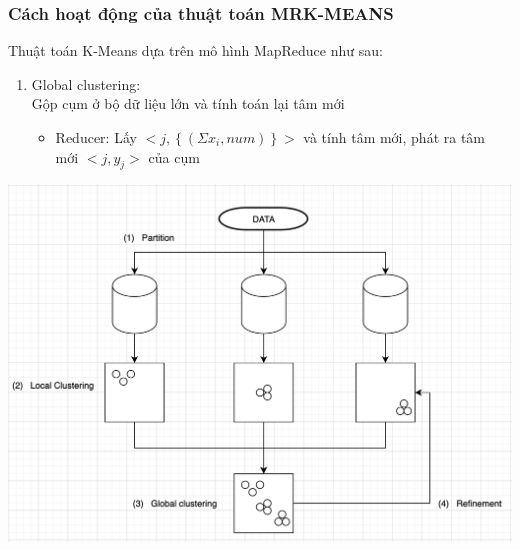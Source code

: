 \documentclass[12pt]{beamer}
\begin{document}
	\begin{frame}
		\frametitle{Cách hoạt động của thuật toán MRK-MEANS}
		Thuật toán K-Means dựa trên mô hình MapReduce như sau:
		\begin{enumerate}[Bước 3:]
			\item Global clustering:\\
			Gộp cụm ở bộ dữ liệu lớn và tính toán lại tâm mới\\
			\begin{itemize}
				\item Reducer: Lấy $<j, \left\{ (\Sigma x_i, num) \right\}>$ và tính tâm mới, phát ra tâm mới $<j, y_j>$ của cụm
			\end{itemize}
		\end{enumerate}
		\includegraphics[scale=0.27]{MRK-Means.png}
	\end{frame}
	
\end{document}
